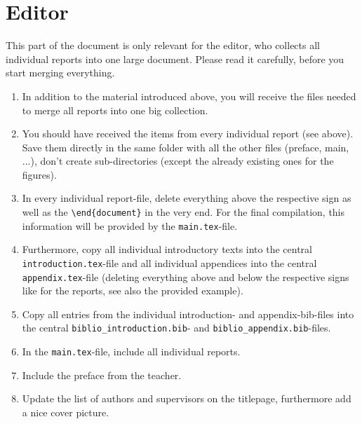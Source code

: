 \documentclass[11pt,a4paper]{article}
\begin{document}
\vspace{3cm}

\section{Editor}
This part of the document is only relevant for the editor, who collects all individual reports into one large document. Please read it carefully, before you start merging everything.

\begin{enumerate}
    \item In addition to the material introduced above, you will receive the files needed to merge all reports into one big collection.
    \item You should have received the items from every individual report (see above). Save them directly in the same folder with all the other files (preface, main, ...), don't create sub-directories (except the already existing ones for the figures). 
    \item In every individual report-file, delete everything above the respective sign as well as the \texttt{\textbackslash end\{document\}} in the very end. For the final compilation, this information will be provided by the \texttt{main.tex}-file.
    \item Furthermore, copy all individual introductory texts into the central \texttt{introduction.tex}-file and all individual appendices into the central \texttt{appendix.tex}-file (deleting everything above and below the respective signs like for the reports, see also the provided example).
    \item Copy all entries from the individual introduction- and appendix-bib-files into the central \texttt{biblio\_introduction.bib}- and \texttt{biblio\_appendix.bib}-files.
    \item In the \texttt{main.tex}-file, include all individual reports.
    \item Include the preface from the teacher.
    \item Update the list of authors and supervisors on the titlepage, furthermore add a nice cover picture.
\end{enumerate}
\end{document}
